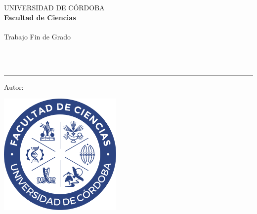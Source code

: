 
\AddToShipoutPicture*{\BackgroundPic}
\begin{titlepage}
\begin{center}
\Large UNIVERSIDAD DE CÓRDOBA\\[0.5 cm]
\large  \textbf{Facultad de Ciencias}\\[1.25 cm]
\large \textbf{\titulacion}\\[1.25 cm]
\Large  Trabajo Fin de Grado\\[2.25 cm]
\Huge   \titulo
\end{center}
\vspace{1.25cm}
\\[0.3cm]
\\[0.5cm]
{\color{blue}\hrule}
\vspace{0.5cm}
\noindent \Large{Autor: \autor}
\vfill
\begin{center}
 \includegraphics[width=6cm]{img/Logotipo_I_Facultad_de_Ciencias_Fondo_blanco_negativo.png} 
\end{center}
\vfill
\rightline{\fecha ~ \currenttime}
\end{titlepage}
\renewcommand{\baselinestretch}{0.9}
\ClearShipoutPicture





